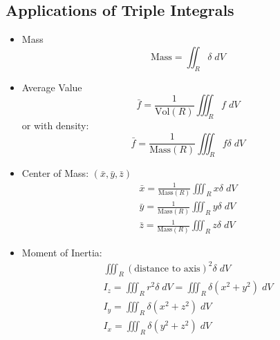 \documentclass[../main.tex]{subfiles}
\begin{document}
\subsection{Applications of Triple Integrals}
\begin{itemize}
    \item Mass
        \begin{equation*}
            \text{Mass} = \iint_R \delta \; dV 
        \end{equation*}
    \item Average Value 
        \begin{equation*}
            \bar f = \frac1{\text{Vol}(R)} \iiint_R f \; dV
        \end{equation*}
        or with density: 
        \begin{equation*}
            \bar f = \frac1{\text{Mass}(R)} \iiint_R f \delta \; dV
        \end{equation*}
    \item Center of Mass: $(\bar x, \bar y, \bar z)$
        \begin{align*}
            \bar x = \frac1{\text{Mass}(R)} \iiint_R x \delta \; dV \\
            \bar y = \frac1{\text{Mass}(R)} \iiint_R y \delta \; dV \\
            \bar z = \frac1{\text{Mass}(R)} \iiint_R z \delta \; dV
        \end{align*}
    \item Moment of Inertia: 
        \begin{align*}
            \iiint_R (\text{distance to axis})^2 \delta \; dV \\
			I_z = \iiint_R r^2 \delta \; dV = \iiint_R \delta (x^2 + y^2) \; dV \\
			I_y = \iiint_R \delta (x^2 + z^2) \; dV \\
			I_x = \iiint_R \delta (y^2 + z^2) \; dV \\
        \end{align*}
\end{itemize}
\end{document}
